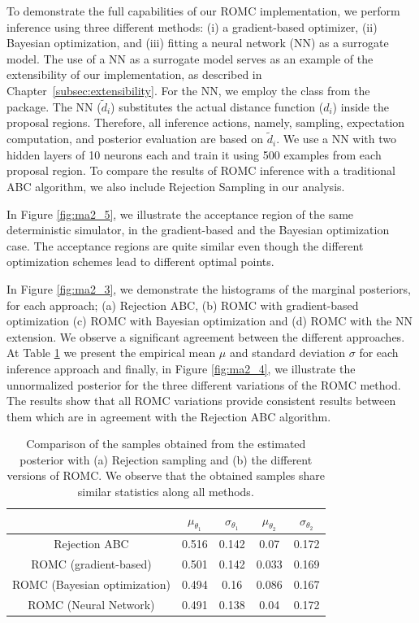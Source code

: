 \documentclass[article, shortnames]{jss}
\begin{document}
To demonstrate the full capabilities of our ROMC implementation, we
perform inference using three different methods: (i) a gradient-based
optimizer, (ii) Bayesian optimization, and (iii) fitting a neural
network (NN) as a surrogate model. The use of a NN as a surrogate
model serves as an example of the extensibility of our implementation,
as described in Chapter~\ref{subsec:extensibility}. For the NN, we
employ the  class from the 
package. The NN (\(\tilde{d}_i\)) substitutes the actual distance
function (\(d_i\)) inside the proposal regions. Therefore, all
inference actions, namely, sampling, expectation computation, and
posterior evaluation are based on \(\tilde{d}_i\). We use a NN with
two hidden layers of 10 neurons each and train it using 500 examples
from each proposal region. To compare the results of ROMC inference
with a traditional ABC algorithm, we also include Rejection Sampling
in our analysis.

In Figure \ref{fig:ma2_5}, we illustrate the acceptance region of the
same deterministic simulator, in the gradient-based and the Bayesian
optimization case. The acceptance regions are quite similar even though the
different optimization schemes lead to different optimal points.

In Figure \ref{fig:ma2_3}, we demonstrate the histograms of the
marginal posteriors, for each approach; (a) Rejection ABC, (b) ROMC
with gradient-based optimization (c) ROMC with Bayesian optimization
and (d) ROMC with the NN extension. We observe a significant agreement
between the different approaches. At Table \ref{tab:ma2} we present
the empirical mean \(\mu\) and standard deviation \(\sigma\) for each
inference approach and finally, in Figure \ref{fig:ma2_4}, we
illustrate the unnormalized posterior for the three different
variations of the ROMC method. The results show that all ROMC
variations provide consistent results between them which are in
agreement with the Rejection ABC algorithm.

\begin{table}
\begin{center}
\begin{tabular}{ c|c|c|c|c }
\hline
& \(\mu_{\theta_1}\) & \(\sigma_{\theta_1}\) & \(\mu_{\theta_2}\) & \(\sigma_{\theta_2}\) \\
\hline \hline
Rejection ABC & 0.516 & 0.142 & 0.07 & 0.172 \\
\hline
ROMC (gradient-based) & 0.501 & 0.142 & 0.033 & 0.169 \\
\hline
ROMC (Bayesian optimization) & 0.494 & 0.16 & 0.086 & 0.167 \\
\hline
ROMC (Neural Network) & 0.491 & 0.138 & 0.04 & 0.172 \\
\hline
\end{tabular}
\end{center}
\caption{Comparison of the samples obtained from the estimated
  posterior with (a) Rejection sampling and (b) the different versions
  of ROMC. We observe that the obtained samples share similar
  statistics along all methods. \label{tab:ma2}}
\end{table}
\end{document}
